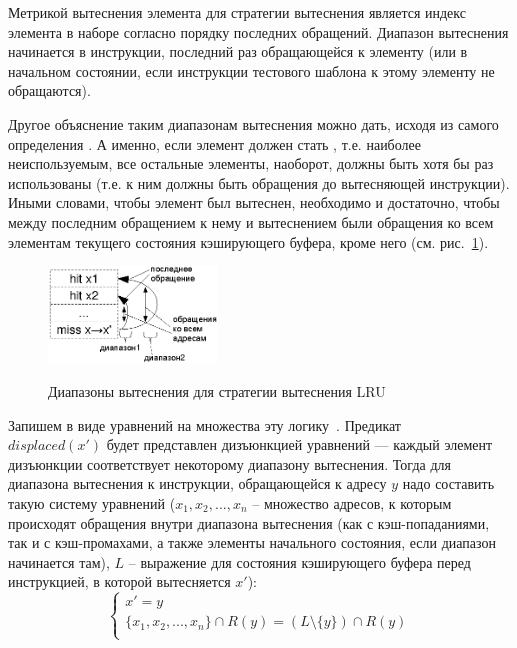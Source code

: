 \begin{utv}
Метрикой вытеснения элемента для стратегии вытеснения \LRU является
индекс элемента в наборе согласно порядку последних обращений.
Диапазон вытеснения начинается в инструкции, последний раз
обращающейся к элементу (или в начальном состоянии, если инструкции
тестового шаблона к этому элементу не обращаются).
\end{utv}

Другое объяснение таким диапазонам вытеснения можно дать, исходя из
самого определения \LRU. А именно, если элемент должен стать \LRU,
т.е. наиболее неиспользуемым, все остальные элементы, наоборот,
должны быть хотя бы раз использованы (т.е. к ним должны быть
обращения до вытесняющей инструкции). Иными словами, чтобы элемент
был вытеснен, необходимо и достаточно, чтобы между последним
обращением к нему и вытеснением были обращения ко всем элементам
текущего состояния кэширующего буфера, кроме него (см.
рис.~\ref{lru-ranges}).

\begin{figure}[h] \center
  \includegraphics[width=0.4\textwidth]{2.theor/lru}\\
  \caption{Диапазоны вытеснения для стратегии вытеснения LRU}\label{lru-ranges}
\end{figure}

Запишем в виде уравнений на множества эту логику~\cite{my_syrcose_2009}. Предикат\\
$displaced(x')$ будет представлен дизъюнкцией уравнений --- каждый
элемент дизъюнкции соответствует некоторому диапазону вытеснения.
Тогда для диапазона вытеснения к инструкции, обращающейся к адресу
$y$ надо составить такую систему уравнений ($x_1, x_2, ..., x_n$ --
множество адресов, к которым происходят обращения внутри диапазона
вытеснения (как с кэш-попаданиями, так и с кэш-промахами, а также
элементы начального состояния, если диапазон начинается там), $L$ --
выражение для состояния кэширующего буфера перед инструкцией, в
которой вытесняется $x'$):
$$
\left\{
   \begin{array}{l}
    x' = y \\
    \{x_1, x_2, ..., x_n\} \cap R(y) = (L \setminus \{y\}) \cap R(y)\\
   \end{array}
  \right.
$$

